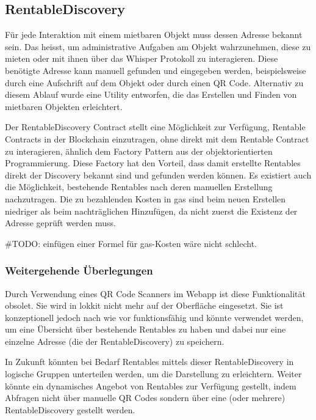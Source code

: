 \subsection{RentableDiscovery}
Für jede Interaktion mit einem mietbaren Objekt muss dessen Adresse bekannt sein. Das heisst, um administrative Aufgaben am Objekt wahrzunehmen, diese zu mieten oder mit ihnen über das Whisper Protokoll zu interagieren. Diese benötigte Adresse kann manuell gefunden und eingegeben werden, beispielsweise durch eine Aufschrift auf dem Objekt oder durch einen QR Code. Alternativ zu diesem Ablauf wurde eine Utility entworfen, die das Erstellen und Finden von mietbaren Objekten erleichtert.

Der RentableDiscovery Contract stellt eine Möglichkeit zur Verfügung, Rentable Contracts in der Blockchain einzutragen, ohne direkt mit dem Rentable Contract zu interagieren, ähnlich dem Factory Pattern aus der objektorientierten Programmierung. Diese Factory hat den Vorteil, dass damit erstellte Rentables direkt der Discovery bekannt sind und gefunden werden können. Es existiert auch die Möglichkeit, bestehende Rentables nach deren manuellen Erstellung nachzutragen. Die zu bezahlenden Kosten in gas sind beim neuen Erstellen niedriger als beim nachträglichen Hinzufügen, da nicht zuerst die Existenz der Adresse geprüft werden muss.

\#TODO: einfügen einer Formel für gas-Kosten wäre nicht schlecht.

\subsubsection{Weitergehende Überlegungen}
Durch Verwendung eines QR Code Scanners im Webapp ist diese Funktionalität obsolet. Sie wird in lokkit nicht mehr auf der Oberfläche eingesetzt. Sie ist konzeptionell jedoch nach wie vor funktionsfähig und könnte verwendet werden, um eine Übersicht über bestehende Rentables zu haben und dabei nur eine einzelne Adresse (die der RentableDiscovery) zu speichern.

In Zukunft könnten bei Bedarf Rentables mittels dieser RentableDiscovery in logische Gruppen unterteilen werden, um die Darstellung zu erleichtern. Weiter könnte ein dynamisches Angebot von Rentables zur Verfügung gestellt, indem Abfragen nicht über manuelle QR Codes sondern über eine (oder mehrere) RentableDiscovery gestellt werden.
